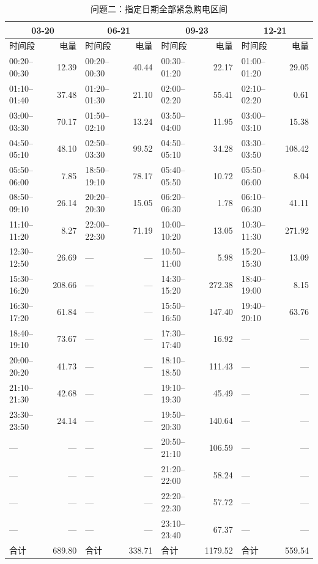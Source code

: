 \FloatBarrier
\begin{table}[htbp]\centering\scriptsize
\caption{问题二：指定日期全部紧急购电区间}
\setlength{\tabcolsep}{3pt}\begin{tabular}{lrlrlrlr}\toprule
\multicolumn{2}{c}{03-20} & \multicolumn{2}{c}{06-21} & \multicolumn{2}{c}{09-23} & \multicolumn{2}{c}{12-21}\\\midrule
时间段 & 电量 & 时间段 & 电量 & 时间段 & 电量 & 时间段 & 电量\\
00:20--00:30 & 12.39 & 00:20--00:30 & 40.44 & 00:30--01:20 & 22.17 & 01:00--01:20 & 29.05\\
01:10--01:40 & 37.48 & 01:20--01:30 & 21.10 & 02:00--02:20 & 55.41 & 02:10--02:20 & 0.61\\
03:00--03:30 & 70.17 & 01:50--02:10 & 13.24 & 03:50--04:00 & 11.95 & 03:00--03:10 & 15.38\\
04:50--05:10 & 48.10 & 02:50--03:30 & 99.52 & 04:50--05:10 & 34.28 & 03:30--03:50 & 108.42\\
05:50--06:00 & 7.85 & 18:50--19:10 & 78.17 & 05:40--05:50 & 10.72 & 05:50--06:00 & 8.04\\
08:50--09:10 & 26.14 & 20:20--20:30 & 15.05 & 06:20--06:30 & 1.78 & 06:10--06:30 & 41.11\\
11:10--11:20 & 8.27 & 22:00--22:30 & 71.19 & 10:00--10:20 & 13.05 & 10:30--11:30 & 271.92\\
12:30--12:50 & 26.69 & — & — & 10:50--11:00 & 5.98 & 15:20--15:30 & 13.09\\
15:30--16:20 & 208.66 & — & — & 14:30--15:20 & 272.38 & 18:40--19:00 & 8.15\\
16:30--17:20 & 61.84 & — & — & 15:50--16:50 & 147.40 & 19:40--20:10 & 63.76\\
18:40--19:10 & 73.67 & — & — & 17:30--17:40 & 16.92 & — & —\\
20:00--20:20 & 41.73 & — & — & 18:10--18:50 & 111.43 & — & —\\
21:10--21:30 & 42.68 & — & — & 19:10--19:30 & 45.49 & — & —\\
23:30--23:50 & 24.14 & — & — & 19:50--20:30 & 140.64 & — & —\\
— & — & — & — & 20:50--21:10 & 106.59 & — & —\\
— & — & — & — & 21:20--22:00 & 58.24 & — & —\\
— & — & — & — & 22:20--22:30 & 57.72 & — & —\\
— & — & — & — & 23:10--23:40 & 67.37 & — & —\\
合计 & 689.80 & 合计 & 338.71 & 合计 & 1179.52 & 合计 & 559.54\\
\bottomrule\end{tabular}\end{table}

